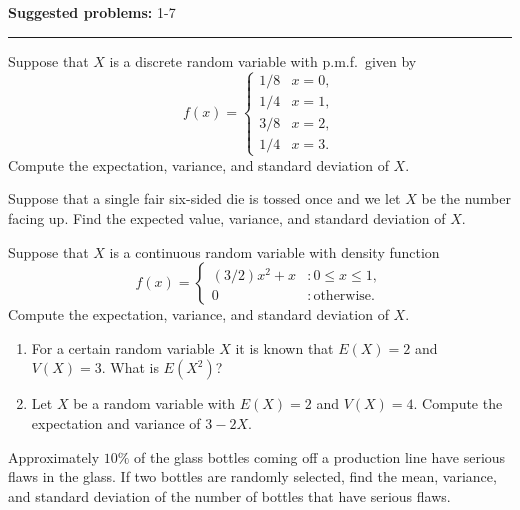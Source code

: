 \documentclass[12pt,reqno]{amsart}
\begin{document}
\textbf{Suggested problems:} 1-7

\bigskip
\hrule

\bigskip
\prob Suppose that $X$ is a discrete random variable with p.m.f.\ given by
	\[
	f(x) = \begin{cases}
	1/8 & x=0,   \\
	1/4 & x=1,   \\
	3/8 & x=2,  \\
	1/4 & x=3 .
	\end{cases}
	\]
Compute the expectation, variance, and standard deviation of $X$.

\vfill
\prob Suppose that a single fair six-sided die is tossed once and we let $X$ be the number facing up. Find the expected value, variance, and standard deviation of $X$.

\vfill
\prob Suppose that $X$ is a continuous random variable with density function
	\[
	f(x) = \begin{cases}
	(3/2)x^2 + x & : 0\leq x \leq 1, \\
	0 & : \text{otherwise}.
	\end{cases}
	\]
Compute the expectation, variance, and standard deviation of $X$.

\vfill
\newpage
\prob

\begin{enumerate}
\item For a certain random variable $X$ it is known that $E(X)=2$ and $V(X) = 3$. What is $E(X^2)$?\vfill
\item Let $X$ be a random variable with $E(X)=2$ and $V(X)=4$. Compute the expectation and variance of $3-2X$.\vfill
\end{enumerate}

\prob Approximately $10\%$ of the glass bottles coming off a production line have serious flaws in the glass. If two bottles are randomly selected, find the mean, variance, and standard deviation of the number of bottles that have serious flaws.\vfill
\end{document}
